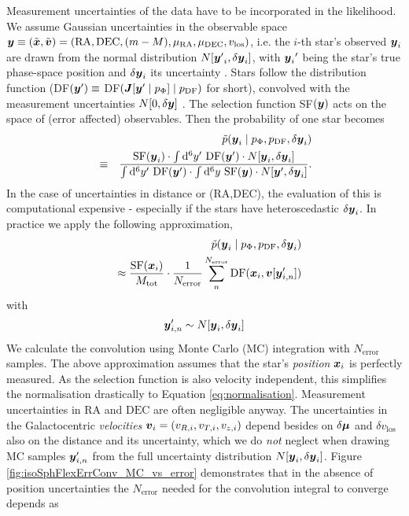 
Measurement uncertainties of the data have to be incorporated in the likelihood. We assume Gaussian uncertainties in the observable space $\boldsymbol{y} \equiv (\tilde{\boldsymbol{x}},\tilde{\boldsymbol{v}})=(\text{RA},\text{DEC},(m-M),\mu_\text{RA},\mu_\text{DEC},v_\text{los})$, i.e. the $i$-th star's observed $\boldsymbol{y}_i$ are drawn from the normal distribution $N[{\boldsymbol{y}'}_i,\delta \boldsymbol{y}_i]$, with ${\boldsymbol{y}_i}'$ being the star's true phase-space position and $\delta \boldsymbol{y}_i$ its uncertainty . Stars follow the distribution function (DF$(\boldsymbol{y}') \equiv$ DF$(\boldsymbol{J}[\boldsymbol{y}' \mid p_\Phi] \mid p_\text{DF})$ for short), convolved with the measurement uncertainties $N[0,\delta \boldsymbol{y}]$ . The selection function SF$(\boldsymbol{y})$ acts on the space of (error affected) observables. Then the probability of one star becomes
\begin{eqnarray*}
&&\tilde{p}(\boldsymbol{y}_i \mid p_\Phi,p_\text{DF},\delta \boldsymbol{y}_i)\\
& \equiv& \frac{\text{SF}(\boldsymbol{y}_i) \cdot \int \mathop{}\!\mathrm{d^6} y' \  \text{DF}(\boldsymbol{y}') \cdot N[\boldsymbol{y}_i,\delta \boldsymbol{y}_i]}{\int \mathop{}\!\mathrm{d^6}y'  \  \text{DF}(\boldsymbol{y}')  \cdot  \int \mathop{}\!\mathrm{d^6} y \  \text{SF}(\boldsymbol{y})  \cdot N[\boldsymbol{y}',\delta \boldsymbol{y}_i]}.
\end{eqnarray*}
In the case of uncertainties in distance or (RA,DEC), the evaluation of this is computational expensive - especially if the stars have heteroscedastic $\delta \boldsymbol{y}_i$. In practice we apply the following approximation,
\begin{eqnarray}
&&\tilde{p}(\boldsymbol{y}_i \mid p_\Phi,p_\text{DF},\delta \boldsymbol{y}_i) \nonumber\\
&&\approx \frac{ \text{SF}(\boldsymbol{x}_i)}{M_\text{tot}} \cdot \frac{1}{N_\text{error}} \sum_n^{N_\text{error}}  \text{DF}(\boldsymbol{x}_i,\boldsymbol{v}[\boldsymbol{y}'_{i,n}]) \label{eq:errorconv}
\end{eqnarray}
with
\begin{eqnarray}
\boldsymbol{y}'_{i,n} \sim N[\boldsymbol{y}_i,\delta \boldsymbol{y}_i]\nonumber
\end{eqnarray}
We calculate the convolution using Monte Carlo (MC) integration with $N_\text{error}$ samples. The above approximation assumes that the star's \emph{position} $\boldsymbol{x}_i$ is perfectly measured. As the selection function is also velocity independent, this simplifies the normalisation drastically to Equation \ref{eq:normalisation}. Measurement uncertainties in $\mathrm{RA}$ and $\mathrm{DEC}$ are often negligible anyway. The uncertainties in the Galactocentric \emph{velocities} $\boldsymbol{v}_i = (v_{R,i},v_{T,i},v_{z,i})$ depend besides on $\delta \boldsymbol{\mu}$ and $\delta v_\text{los}$ also on the distance and its uncertainty, which we do \emph{not} neglect when drawing MC samples $\boldsymbol{y}'_{i,n}$ from the full uncertainty distribution $N[\boldsymbol{y}_i,\delta \boldsymbol{y}_i]$. Figure \ref{fig:isoSphFlexErrConv_MC_vs_error} demonstrates that in the absence of position uncertainties the $N_\text{error}$ needed for the convolution integral to converge depends as
